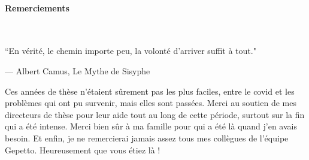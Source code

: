 

\setlength\epigraphwidth{8cm}
\setlength\epigraphrule{0pt}
\makeatletter
{}
\makeatother


\newpage

\noindent\makebox[\linewidth]{\rule{0.6\textwidth}{2pt}}

\small

\paragraph{Remerciements}~

\epigraph{``En vérité, le chemin importe peu, la volonté d'arriver suffit à tout."}{--- \textup{Albert Camus}, Le Mythe de Sisyphe}


Ces années de thèse n'étaient sûrement pas les plus faciles, entre le covid et les problèmes qui ont pu survenir, mais elles sont passées.
Merci au soutien de mes directeurs de thèse pour leur aide tout au long de cette période, surtout sur la fin qui a été intense. 
Merci bien sûr à ma famille pour qui a été là quand j'en avais besoin. 
Et enfin, je ne remercierai jamais assez tous mes collègues de l'équipe Gepetto. Heureusement que vous étiez là !
